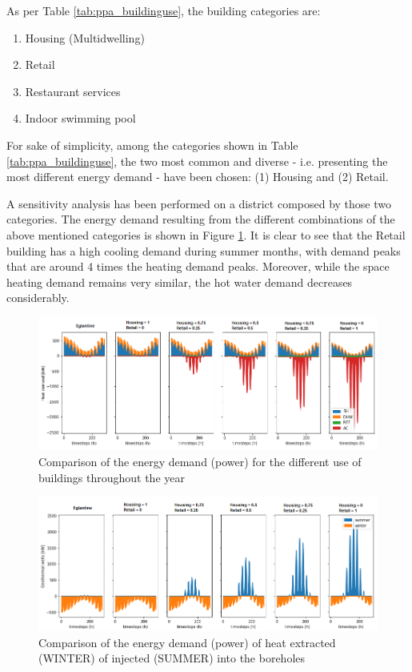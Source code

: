 \documentclass{article}
\begin{document}
As per Table \ref{tab:ppa_buildinguse}, the building categories are:
\begin{enumerate}
	\item Housing (Multidwelling)
	\item Retail
	\item Restaurant services
	\item Indoor swimming pool
\end{enumerate}
For sake of simplicity, among the categories shown in Table \ref{tab:ppa_buildinguse}, the two most common and diverse - i.e. presenting the most different energy demand - have been chosen: (1) Housing and (2) Retail. 

A sensitivity analysis has been performed on a district composed by those two categories. The energy demand resulting from the different combinations of the above mentioned categories is shown in Figure \ref{fig:CU_E}. It is clear to see that the Retail building has a high cooling demand during summer months, with demand peaks that are around 4 times the heating demand peaks. Moreover, while the space heating demand remains very similar, the hot water demand decreases considerably.

\begin{figure}[htp]
	\centering
	\includegraphics[width=1\textwidth]{CU_Edemand.png}
	\caption{Comparison of the energy demand (power) for the different use of buildings throughout the year}
	\label{fig:CU_E}
\end{figure}

\begin{figure}[htp]
	\centering
	\includegraphics[width=1\textwidth]{CU_gtw.png}
	\caption{Comparison of the energy demand (power) of heat extracted (WINTER) of injected (SUMMER) into the boreholes}
	\label{fig:CU_gtw}
\end{figure}
\end{document}
